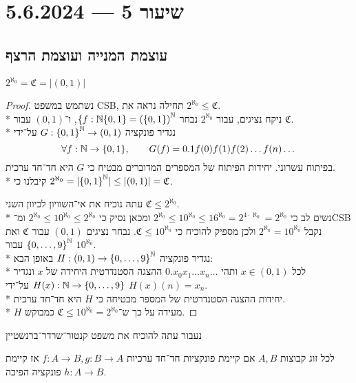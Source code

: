 \section{שיעור 5 --- 5.6.2024}
\subsection{עוצמת המנייה ועוצמת הרצף}
\begin{theorem}
	$2^{\aleph_0} = \mathfrak{C} = |(0, 1)|$
\end{theorem}
\begin{proof}
	נשתמש במשפט CSB, תחילה נראה את $2^{\aleph_0} \le \mathfrak{C}$. \\*
	ניקח נציגים, עבור $2^{\aleph_0}$ נבחר $\{ f : \mathbb{N} \{0, 1\} = {(\{0, 1\})}^{\mathbb{N}}$, ו־$(0, 1)$ עבור $\mathfrak{C}$. \\*
		נגדיר פונקציה $G : {\{0, 1\}}^{\mathbb{N}} \to (0, 1)$ על־ידי
		\[
			\forall f : \mathbb{N} \to \{0, 1\},
			\qquad
			G(f) = 0.1f(0) f(1) f(2) \dots f(n)\dots
		\]
		בפיתוח עשרוני. יחידות הפיתוח של המספרים המדוברים מבטיח כי $G$ היא חד־חד ערכית. \\*
		קיבלנו כי $2^{\aleph_0} = |{\{0, 1\}}^{\mathbb{N}}| \le |(0, 1)| = \mathfrak{C}$.

		עתה נוכיח את אי־השוויון לכיוון השני $\mathfrak{C} \le 2^{\aleph_0}$. \\*
		נשים לב כי $2^{\aleph_0} \le 10^{\aleph_0} \le 16^{\aleph_0} = 2^{4 \cdot \aleph_0} = 2^{\aleph_0}$
		ומכאן נסיק כי $2^{\aleph_0} \le 10^{\aleph_0} \le 2^{\aleph_0}$ ומ־CSB נקבל $2^{\aleph_0} = 10^{\aleph_0}$
		ולכן מספיק להוכיח כי $\mathfrak{C} \le 10^{\aleph_0}$.
		נבחר נציגים $(0, 1)$ עבור $\mathfrak{C}$ ואת ${\{0, \dots, 9\}}^{\mathbb{N}}$ עבור $10^{\aleph_0}$. \\*
		נגדיר פונקציה $H : (0, 1) \to {\{0, \dots, 9\}}^{\mathbb{N}}$ באופן הבא: \\*
		לכל $x \in (0, 1)$ ותהי $0.x_0 x_1 \dots x_n\dots$ ההצגה הסטנדרטית היחידה של $x$ ונגדיר $H(x) : \mathbb{N} \to \{0, \dots, 9\}$ על־ידי $H(x)(n) = x_n$. \\*
		יחידות ההצגה הסטנדרטית של המספר מבטיחה כי $H$ היא חד־חד ערכית. \\*
		$H$ מעידה על כך ש־$\mathfrak{C} \le 10^{\aleph_0} = 2^{\aleph_0}$ כמבוקש.
\end{proof}
נעבור עתה להוכיח את משפט קנטור־שרדר־ברנשטיין
\begin{theorem}
	לכל זוג קבוצות $A, B$ אם קיימת פונקציות חד־חד ערכיות $f : A \to B, g : B \to A$ אז קיימת פונקציה הפיכה $h : A \to B$.
\end{theorem}
